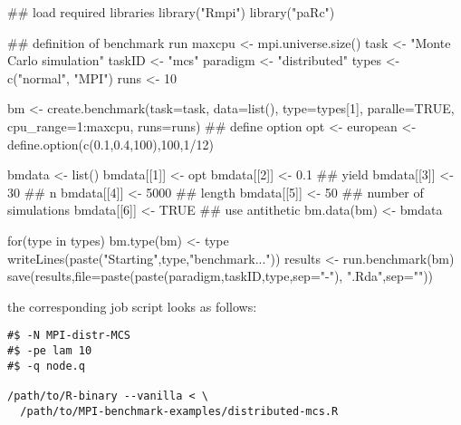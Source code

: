 \begin{Scode}
## load required libraries
library("Rmpi")
library("paRc")

## definition of benchmark run
maxcpu <- mpi.universe.size()
task <- "Monte Carlo simulation"
taskID <- "mcs"
paradigm <- "distributed"
types <- c("normal", "MPI")
runs <- 10


bm <- create.benchmark(task=task, data=list(),
                       type=types[1], paralle=TRUE,
                       cpu_range=1:maxcpu, runs=runs)
## define option
opt <- european <- define.option(c(0.1,0.4,100),100,1/12)

bmdata <- list()
bmdata[[1]] <- opt
bmdata[[2]] <- 0.1 ## yield
bmdata[[3]] <- 30  ## n
bmdata[[4]] <- 5000 ## length
bmdata[[5]] <- 50  ## number of simulations
bmdata[[6]] <- TRUE ## use antithetic
bm.data(bm) <- bmdata

for(type in types){
  bm.type(bm) <- type
  writeLines(paste("Starting",type,"benchmark..."))
  results <- run.benchmark(bm)
  save(results,file=paste(paste(paradigm,taskID,type,sep="-"),
                          ".Rda",sep=""))
}

\end{Scode}
the corresponding job script looks as follows:

\begin{verbatim}
#$ -N MPI-distr-MCS
#$ -pe lam 10
#$ -q node.q

/path/to/R-binary --vanilla < \
  /path/to/MPI-benchmark-examples/distributed-mcs.R
\end{verbatim}
